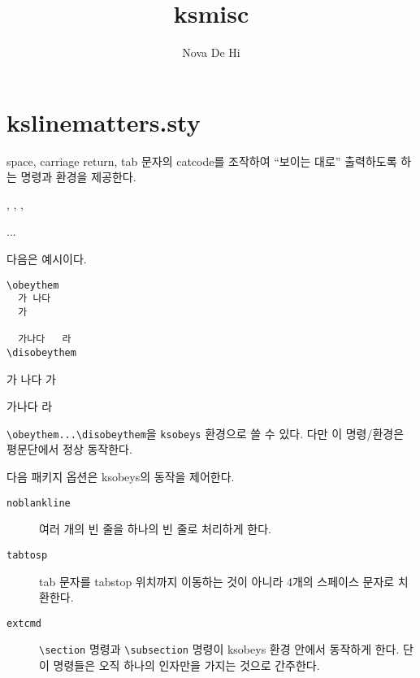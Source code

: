 \documentclass[nanum,b5paper]{oblivoir}
\begin{document}
\title{ksmisc}
\author{Nova De Hi}
\maketitle

\section{kslinematters.sty}

space, carriage return, tab 문자의 catcode를 조작하여 ``보이는 대로'' 출력하도록 하는 명령과 환경을 제공한다.
\begin{boxedverbatim}
\obeythem, \disobeythem
\vobeyspaces, \vobeytabs, \vobeylines
\begin{ksobeys} ... \end{ksobeys}
\end{boxedverbatim}

다음은 예시이다.
\begin{verbatim}
\obeythem
  가 나다
  가

  가나다 	라
\disobeythem
\end{verbatim}
\begin{framed}
\obeythem
  가 나다
  가

  가나다 	라
\disobeythem
\end{framed}

\verb|\obeythem...\disobeythem|을 \verb|ksobeys| 환경으로 쓸 수 있다.
다만 이 명령/환경은 평문단에서 정상 동작한다.

다음 패키지 옵션은 ksobeys의 동작을 제어한다.

\begin{description}
 \item [\texttt{noblankline}] 여러 개의 빈 줄을 하나의 빈 줄로 처리하게 한다.
 \item [\texttt{tabtosp}] tab 문자를 tabstop 위치까지 이동하는 것이 아니라 4개의 스페이스 문자로 치환한다.
 \item [\texttt{extcmd}] \verb|\section| 명령과 \verb|\subsection| 명령이 ksobeys 환경 안에서 동작하게 한다. 단 이 명령들은 오직 하나의 인자만을 가지는 것으로 간주한다.
\end{description}
\end{document}
